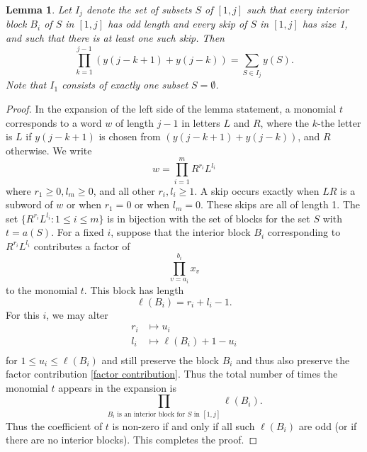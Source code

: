 \documentclass[11pt, oneside]{article}   	%
\newtheorem{lemma}{Lemma}
\begin{document}
\begin{lemma} \label{l Ij}
Let $I_j$ denote the set of subsets $S$ of $[1,j]$ such that every interior block $B_i$ of $S$ in $[1,j]$ has odd length and every skip of $S$ in $[1,j]$ has size 1, and such that there is at least one such skip.  
Then
\[
\prod_{k=1}^{j-1} (y(j-k+1)+ y(j-k)) = \sum_{S \in I_j} y(S).
\]
Note that $I_1$ consists of exactly one subset $S = \emptyset$. 
\end{lemma}
\begin{proof}
 In the expansion of the left side of the lemma statement, a monomial $t$ corresponds to a word $w$ of length $j-1$ in letters $L$ and $R$, where the $k$-the letter is $L$ if $y(j-k+1)$ is chosen from $(y(j-k+1)+ y(j-k))$, and $R$ otherwise. We write 
 \[
 w = \prod_{i=1}^m R^{r_i} L^{l_i}
 \]
 where $r_1\geq 0, l_m \geq 0$, and all other $r_i, l_i \geq 1$. A skip occurs exactly when $LR$ is a subword of $w$ or when $r_1=0$ or when $l_m =0$. These skips are all of length 1. The set $\{ R^{r_i}L^{l_i}\colon 1 \leq i \leq m\}$ is in bijection with the set of blocks for the set $S$ with $t = a(S)$. For a fixed $i$, suppose that the interior block $B_i$ corresponding to $ R^{r_i}L^{l_i}$ contributes a factor of 
 \begin{equation} \label{factor contribution}
\prod_{v=a_i}^{b_i} x_{v}
 \end{equation}
 to the monomial $t$. This block has length
 \[
\ell(B_i)= r_i + l_i -1.
 \] 
For this $i$, we may alter 
\begin{align*}
r_i & \mapsto u_i \\ 
l_i & \mapsto \ell(B_i)+1-u_i \\ 
\end{align*}
for $1 \leq u_i \leq \ell(B_i)$ and still preserve the block $B_i$ and thus also preserve the factor contribution \eqref{factor contribution}. Thus the total number of times the monomial $t$ appears in the expansion is 
\[
\prod_{B_i \text{ is an interior block for $S$ in $[1,j]$}} \ell(B_i).
\]
Thus the coefficient of $t$ is non-zero if and only if all such $\ell(B_i)$ are odd (or if there are no interior blocks). This completes the proof.  
\end{proof}
\end{document}

